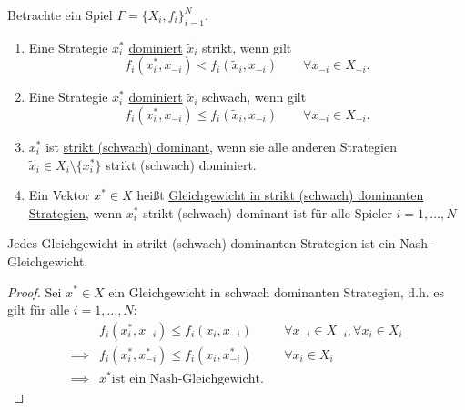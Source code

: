 \begin{definition}
	Betrachte ein Spiel $\Gamma = \{X_{i}, f_{i}\}_{i=1}^{N}$.
	\begin{enumerate}[label=\alph{enumi})]
		\item Eine Strategie $x_{i}^{*}$ \underline{dominiert} $\tilde{x}_{i}$ strikt, wenn gilt
			\[
				f_{i}(x_{i}^{*}, x_{-i}) < f_{i}(\tilde{x}_{i}, x_{-i}) \qquad \forall x_{-i} \in X_{-i}
			.\] 
		\item Eine Strategie $x_{i}^{*}$ \underline{dominiert} $\tilde{x}_{i}$ schwach, wenn gilt
			\[
				f_{i}(x_{i}^{*}, x_{-i}) \leq f_{i}(\tilde{x}_{i}, x_{-i}) \qquad \forall x_{-i} \in X_{-i}
			.\] 
		\item $x_{i}^{*}$ ist \underline{strikt (schwach) dominant}, wenn sie alle anderen Strategien $\tilde{x}_{i} \in X_{i} \setminus \{x_{i}^{*}\}$ strikt (schwach) dominiert.
		\item Ein Vektor $x^{*} \in X$ heißt \underline{Gleichgewicht in strikt (schwach) dominanten Strategien}, wenn $x_{i}^{*}$ strikt (schwach) dominant ist für alle Spieler $i=1, \ldots, N$ 
	\end{enumerate}
\end{definition}

\begin{satz}
	Jedes Gleichgewicht in strikt (schwach) dominanten Strategien ist ein Nash-Gleichgewicht.
\end{satz}

\begin{proof}
	Sei $x^{*} \in X$ ein Gleichgewicht in schwach dominanten Strategien, d.h. es gilt für alle $i=1, \ldots, N$:
	\begin{align*}
		&f_{i}(x_{i}^{*}, x_{-i}) \leq f_{i}(x_{i}, x_{-i})& &\forall x_{-i} \in X_{-i}, \forall x_{i} \in X_{i} \\
		\implies &f_{i}(x_{i}^{*}, x_{-i}^{*}) \leq f_{i}(x_{i}, x_{-i}^{*})& &\forall x_{i} \in X_{i} \\
		\implies &x^{*} \text{ist ein Nash-Gleichgewicht.}
	\end{align*}
\end{proof}

